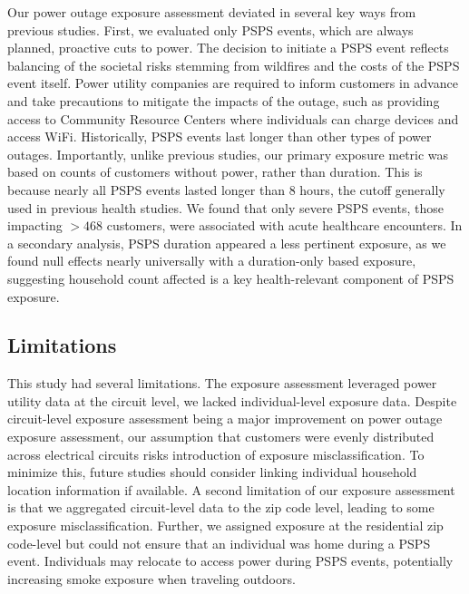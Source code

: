 \documentclass[../main.tex]{subfiles}
\begin{document}
Our power outage exposure assessment deviated in several key ways from previous studies. First, we evaluated only PSPS events, which are always planned, proactive cuts to power. The decision to initiate a PSPS event reflects balancing of the societal risks stemming from wildfires and the costs of the PSPS event itself.\citep{huang2023review} Power utility companies are required to inform customers in advance and take precautions to mitigate the impacts of the outage, such as providing access to Community Resource Centers where individuals can charge devices and access WiFi.\citep{harding2025a} Historically, PSPS events last longer than other types of power outages. Importantly, unlike previous studies, our primary exposure metric was based on counts of customers without power, rather than duration. This is because nearly all PSPS events lasted longer than 8 hours, the cutoff generally used in previous health studies.\citep{do2025spatiotemporal, northrop2024power} We found that only severe PSPS events, those impacting $> 468$ customers, were associated with acute healthcare encounters. In a secondary analysis, PSPS duration appeared a less pertinent exposure, as we found null effects nearly universally with a duration-only based exposure, suggesting household count affected is a key health-relevant component of PSPS exposure.

\subsection{Limitations}
This study had several limitations. The exposure assessment leveraged power utility data at the circuit level, we lacked individual-level exposure data. Despite circuit-level exposure assessment being a major improvement on power outage exposure assessment, our assumption that customers were evenly distributed across electrical circuits risks introduction of exposure misclassification. To minimize this, future studies should consider linking individual household location information if available. A second limitation of our exposure assessment is that we aggregated circuit-level data to the zip code level, leading to some exposure misclassification. Further, we assigned exposure at the residential zip code-level but could not ensure that an individual was home during a PSPS event. Individuals may relocate to access power during PSPS events, potentially increasing smoke exposure when traveling outdoors.
\end{document}
